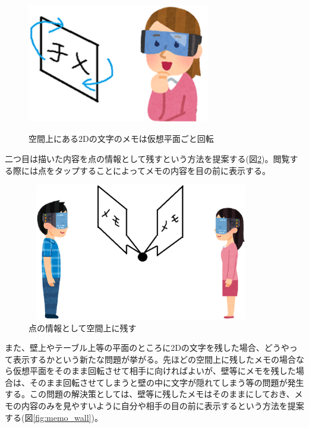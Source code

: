 \documentclass[11pt,a4j, titlepage]{jarticle} %
\begin{document}
\begin{figure}[H]
  \begin{center}
    \includegraphics[clip,height=6.0cm,width=8.0cm]{./memo_kaiten.eps}
    \caption{空間上にある2Dの文字のメモは仮想平面ごと回転}
    \label{fig:memo_kaiten}
  \end{center}
\end{figure}

二つ目は描いた内容を点の情報として残すという方法を提案する(図\ref{fig:memo_ten})。閲覧する際には点をタップすることによってメモの内容を目の前に表示する。

\begin{figure}[H]
  \begin{center}
    \includegraphics[clip,height=6.0cm,width=10.0cm]{./memo_ten.eps}
    \caption{点の情報として空間上に残す}
    \label{fig:memo_ten}
  \end{center}
\end{figure}

また、壁上やテーブル上等の平面のところに2Dの文字を残した場合、どうやって表示するかという新たな問題が挙がる。先ほどの空間上に残したメモの場合なら仮想平面をそのまま回転させて相手に向ければよいが、壁等にメモを残した場合は、そのまま回転させてしまうと壁の中に文字が隠れてしまう等の問題が発生する。この問題の解決策としては、壁等に残したメモはそのままにしておき、メモの内容のみを見やすいように自分や相手の目の前に表示するという方法を提案する(図\ref{fig:memo_wall})。
\end{document}
